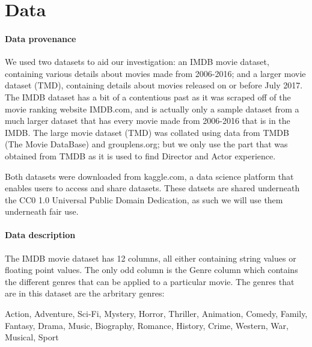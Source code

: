 \section{Data}

    \paragraph{Data provenance}
        We used two datasets to aid our investigation: an IMDB movie dataset\cite*{data:IMDB}, containing
            various details about movies made from 2006-2016; and a larger movie dataset\cite*{data:TMD} (TMD),
            containing details about movies released on or before July 2017.
        The IMDB dataset has a bit of a contentious past as it was scraped off of the movie
            ranking website IMDB.com, and is actually only a sample dataset from a much larger
            dataset that has every movie made from 2006-2016 that is in the IMDB.
        The large movie dataset (TMD) was collated using data from TMDB (The Movie DataBase) and 
            grouplens.org; but we only use the part that was obtained from TMDB as it is used
            to find Director and Actor experience.

        Both datasets were downloaded from kaggle.com, a data science platform that enables users
            to access and share datasets. These datsets are shared underneath the CC0 1.0 Universal
            Public Domain Dedication, as such we will use them underneath fair use.

    \paragraph{Data description}
        The IMDB movie dataset has 12 columns, all either containing string values or floating point values.
        The only odd column is the Genre column which contains the different genres that can be applied to a particular movie.
        The genres that are in this dataset are the arbritary genres: 
            
        Action, Adventure, Sci-Fi, Mystery, Horror, Thriller, Animation, Comedy, Family, Fantasy, Drama, Music, Biography, Romance, History, Crime, Western, War, Musical, Sport
        

